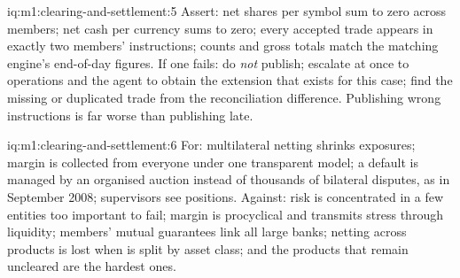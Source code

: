 \begin{solution}{iq:m1:clearing-and-settlement:5}
Assert: net shares per symbol sum to zero across members; net cash per
currency sums to zero; every accepted trade appears in exactly two members'
instructions; counts and gross totals match the matching engine's
end-of-day figures. If one fails: do \emph{not} publish; escalate at once to
operations and the  agent to obtain the extension that exists for
this case; find the missing or duplicated trade from the reconciliation
difference. Publishing wrong instructions is far worse than publishing late.
\end{solution}

\begin{solution}{iq:m1:clearing-and-settlement:6}
For: multilateral netting shrinks exposures; margin is collected from
everyone under one transparent model; a default is managed by an organised
auction instead of thousands of bilateral disputes, as in September 2008;
supervisors see positions. Against: risk is concentrated in a few entities
too important to fail; margin is procyclical and transmits stress through
liquidity; members' mutual guarantees link all large banks; netting across
products is lost when  is split by asset class; and the products that
remain uncleared are the hardest ones.
\end{solution}
